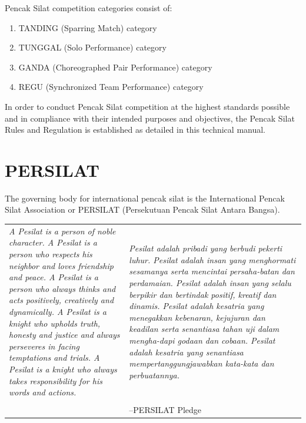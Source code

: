 \begin{titlepage}
\noindent Pencak Silat competition categories consist of: \\
\begin{enumerate}
    \item TANDING (Sparring Match) category
    \item TUNGGAL (Solo Performance) category
    \item GANDA (Choreographed Pair Performance) category
    \item REGU (Synchronized Team Performance) category
\end{enumerate}

\noindent In order to conduct Pencak Silat competition at the highest standards possible and in compliance with 
their intended purposes and objectives, the Pencak Silat Rules and Regulation is established as detailed in this technical manual.
\end{titlepage}

\section*{PERSILAT}
The governing body for international pencak silat is the International Pencak Silat Association or PERSILAT (Persekutuan Pencak Silat Antara Bangsa).

\begin{table}
\begin{tabular}{p{3in}p{3in}}
\emph{A Pesilat is a person of noble character.\newline
A Pesilat is a person who respects his neighbor and loves friendship and peace.\newline
A Pesilat is a person who always thinks and acts positively, creatively and dynamically.\newline
A Pesilat is a knight who upholds truth, honesty and justice and always perseveres in facing temptations and trials.
\newline
A Pesilat is a knight who always takes responsibility for his words and actions.
}
&
\emph{Pesilat adalah pribadi yang berbudi pekerti luhur.\newline
Pesilat adalah insan yang menghormati sesamanya serta mencintai persaha-batan dan perdamaian.\newline
Pesilat adalah insan yang selalu berpikir dan bertindak positif, kreatif dan dinamis.\newline
Pesilat adalah kesatria yang menegakkan kebenaran, kejujuran dan keadilan serta senantiasa tahan uji dalam mengha-dapi godaan dan cobaan.\newline
Pesilat adalah kesatria yang senantiasa mempertanggungjawabkan kata-kata dan perbuatannya.
} \\
& \\
& --PERSILAT Pledge
\end{tabular}
\end{table}

